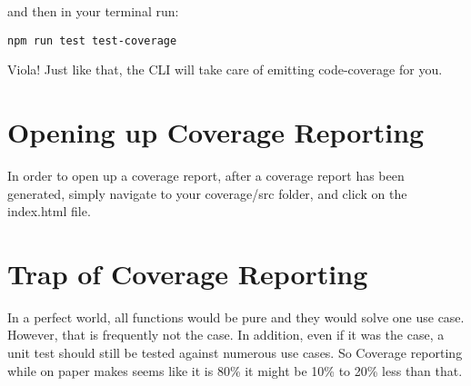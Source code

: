 and then in your terminal run:
\begin{verbatim}
npm run test test-coverage
\end{verbatim}

Viola! Just like that, the CLI will take care of emitting code-coverage for you.

\section{ Opening up Coverage Reporting }
In order to open up a coverage report, after a coverage report has been generated, simply navigate to your coverage/src folder, and click on the index.html file.


\section{ Trap of Coverage Reporting }
In a perfect world, all functions would be pure and they would solve one use case. However, that is frequently not the case. In addition, even if it was the case, a unit test should still be tested against numerous use cases. So Coverage reporting while on paper makes seems like it is 80\% it might be 10\% to 20\% less than that.
